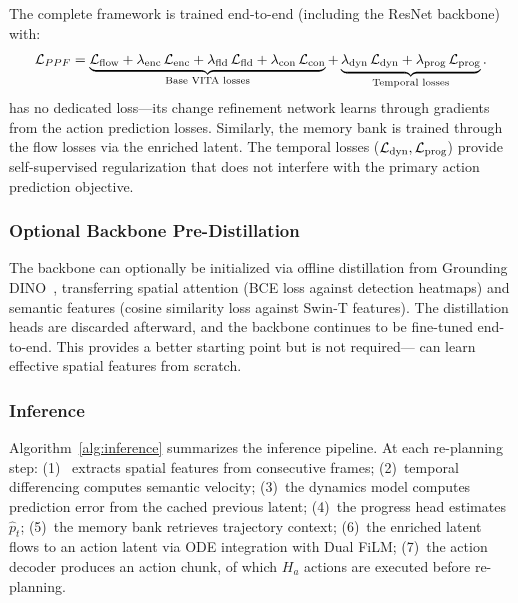 The complete \method{} framework is trained end-to-end (including the ResNet backbone) with:
\begin{equation}
    \mathcal{L}_{PPF{}} = \underbrace{\mathcal{L}_{\text{flow}} + \lambda_{\text{enc}}\,\mathcal{L}_{\text{enc}} + \lambda_{\text{fld}}\,\mathcal{L}_{\text{fld}} + \lambda_{\text{con}}\,\mathcal{L}_{\text{con}}}_{\text{Base VITA losses}} + \underbrace{\lambda_{\text{dyn}}\,\mathcal{L}_{\text{dyn}} + \lambda_{\text{prog}}\,\mathcal{L}_{\text{prog}}}_{\text{Temporal losses}}.
    \label{eq:total_loss}
\end{equation}
\fasa{} has no dedicated loss---its change refinement network learns through gradients from the action prediction losses. Similarly, the memory bank is trained through the flow losses via the enriched latent. The temporal losses ($\mathcal{L}_{\text{dyn}}, \mathcal{L}_{\text{prog}}$) provide self-supervised regularization that does not interfere with the primary action prediction objective.

\subsubsection{Optional Backbone Pre-Distillation}

The backbone can optionally be initialized via offline distillation from Grounding DINO~\cite{liu2023grounding}, transferring spatial attention (BCE loss against detection heatmaps) and semantic features (cosine similarity loss against Swin-T features). The distillation heads are discarded afterward, and the backbone continues to be fine-tuned end-to-end. This provides a better starting point but is not required---\fasa{} can learn effective spatial features from scratch.

\subsubsection{Inference}

Algorithm~\ref{alg:inference} summarizes the \method{} inference pipeline. At each re-planning step: (1)~\fasa{} extracts spatial features from consecutive frames; (2)~temporal differencing computes semantic velocity; (3)~the dynamics model computes prediction error from the cached previous latent; (4)~the progress head estimates $\hat{p}_t$; (5)~the memory bank retrieves trajectory context; (6)~the enriched latent flows to an action latent via ODE integration with Dual FiLM; (7)~the action decoder produces an action chunk, of which $H_a$ actions are executed before re-planning.

